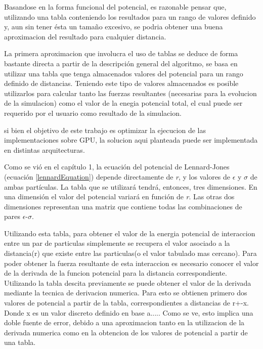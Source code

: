 Basandose en la forma funcional del potencial, es razonable pensar que, utilizando una tabla conteniendo los resultados para un rango de valores definido y, aun sin tener ésta un tamaño excesivo, se podria obtener una buena aproximacion del resultado para cualquier distancia. 
 

La primera aproximacion que involucra el uso de tablas se deduce de forma bastante directa a partir de la descripción general del algoritmo, se basa en utilizar una tabla que tenga almacenados valores del potencial para un rango definido de distancias.
Teniendo este tipo de valores almacenados es posible utilizarlos para calcular tanto las fuerzas resultantes (necesarias para la evolucion de la simulacion) como el valor de la enegia potencial total, el cual puede ser requerido por el usuario como resultado de la simulacion.


 
si bien el objetivo de este trabajo es optimizar la ejecucion de las implementaciones sobre GPU, la solucion aqui planteada puede ser implementada en distintas arquitecturas.

Como se vió en el capítulo 1, la ecuación del potencial de Lennard-Jones (ecuación \ref{lennardEquation}) depende directamente de \textit{r}, y los valores de $\epsilon$ y $\sigma$ de ambas partículas.
La tabla que se utilizará tendrá, entonces, tres dimensiones. En una dimensión el valor del potencial variará en función de \textit{r}.
Las otras dos dimensiones representan una matriz que contiene todas las combinaciones de pares $\epsilon$-$\sigma$.

Utilizando esta tabla, para obtener el valor de la energia potencial de interaccion entre un par de particulas simplemente se recupera el valor asociado a la distancia(r) que existe entre las particulas(o el valor tabulado mas cercano).
Para poder obtener la fuerza resultante de esta interaccion es necesario conocer el valor de la derivada de la funcion potencial para la distancia correspondiente.
Utilizando la tabla descita previamente se puede obtener el valor de la derivada mediante la tecnica de derivacion numerica. 
Para esto se obtienen primero dos valores de potencial a partir de la tabla, correspondientes a distancias de r+-x. Donde x es un valor discreto definido en base a.....
Como se ve, esto implica una doble fuente de error, debido a una aproximacion tanto en la utilizacion de la derivada numerica como en la obtencion de los valores de potencial a partir de una tabla.


